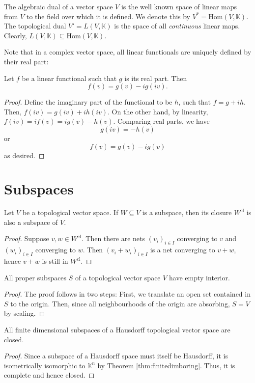 \documentclass[twoside,symmetric, openany, 12pt]{./tuftebook}
\theoremstyle{definition}
\theoremstyle{definition}
\theoremstyle{definition}
\begin{document}
	\begin{Definition}
		The algebraic dual of a vector space $V$ is the well known space of linear maps from $V$ to the field over which it is defined. We denote this by $V^*=\text{Hom}(V,\mathbb{K})$. The topological dual $V'=L(V, \mathbb{K})$ is the space of all \emph{continuous} linear maps. Clearly, $L(V, \mathbb{K})\subseteq \text{Hom}(V,\mathbb{K})$.
	\end{Definition}
Note that in a complex vector space, all linear functionals are uniquely defined by their real part:
\begin{Theorem}
	Let $f$ be a linear functional such that $g$ is its real part. Then
	\[f(v) = g(v) - ig(iv).\]
\end{Theorem}
\begin{proof}
	Define the imaginary part of the functional to be $h$, such that $f=g+ih$. Then, $f(iv) = g(iv) + ih(iv)$. On the other hand, by linearity, $f(iv) = if(v) = ig(v) - h(v)$. Comparing real parts, we have
	\[g(iv) = -h(v)\]
	or
	\[f(v) = g(v) - ig(v)\]
	as desired.
\end{proof}
	\section{Subspaces}
	\begin{Theorem}
		Let $V$ be a topological vector space. If $W\subseteq V$ is a subspace, then its closure $W^\text{cl}$ is also a subspace of $V$.
	\end{Theorem}
	\begin{proof}
Suppose $v,w\in W^\text{cl}$. Then there are nets $(v_i)_{i\in I}$ converging to $v$ and $(w_i)_{i\in I}$ converging to $w$. Then $(v_i+w_i)_{i\in I}$ is a net converging to $v+w$, hence $v+w$ is still in $W^\text{cl}$. 
	\end{proof}
\begin{Theorem}
	All proper subspaces $S$ of a topological vector space $V$ have empty interior.
\end{Theorem}
\begin{proof}
The proof follows in two steps: First, we translate an open set contained in $S$ to the origin. Then, since all neighbourhoods of the origin are absorbing, $S=V$ by scaling.
\end{proof}
\begin{Theorem}
	All finite dimensional subspaces of a Hausdorff topological vector space are closed.
\end{Theorem}
\begin{proof}
	Since a subspace of a Hausdorff space must itself be Hausdorff, it is isometrically isomorphic to $\mathbb{K}^n$ by Theorem \ref{thm:finitedimboring}. Thus, it is complete and hence closed. 
\end{proof}
\end{document}
